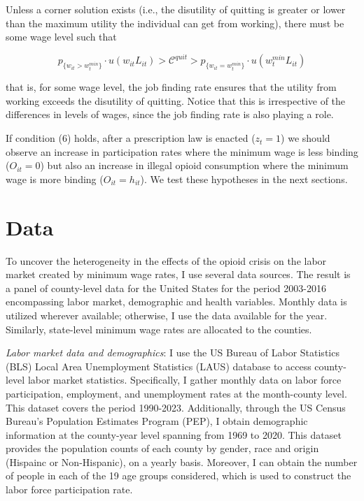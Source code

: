 \documentclass[12pt,a4paper]{article}
\begin{document}
Unless a corner solution exists (i.e., the disutility of quitting is greater or lower than the maximum utility the individual can get from working), there must be some wage level such that

\begin{equation}
    p_{\{w_{it} > w^{min}_t\}}\cdot u(w_{it}L_{it}) > \mathcal{C}^{quit} > p_{\{w_{it} = w^{min}_t\}}\cdot u(w^{min}_t L_{it})
\end{equation}

that is, for some wage level, the job finding rate ensures that the utility from working exceeds the disutility of quitting.
Notice that this is irrespective of the differences in levels of wages, since the job finding rate is also playing a role.

If condition (6) holds, after a prescription law is enacted (\(z_{t} = 1\)) we should observe an increase in participation rates where the minimum wage is less binding (\(O_{it} = 0\)) but also an increase in illegal opioid consumption where the minimum wage is more binding (\(O_{it} = h_{it}\)).
We test these hypotheses in the next sections.

\section*{Data}

To uncover the heterogeneity in the effects of the opioid crisis on the labor market created by minimum wage rates, I use several data sources.
The result is a panel of county-level data for the United States for the period 2003-2016 encompassing labor market, demographic and health variables.
Monthly data is utilized wherever available; otherwise, I use the data available for the year.
Similarly, state-level minimum wage rates are allocated to the counties.

\textit{Labor market data and demographics}: 
I use the US Bureau of Labor Statistics (BLS) Local Area Unemployment Statistics (LAUS) database to access county-level labor market statistics. 
Specifically, I gather monthly data on labor force participation, employment, and unemployment rates at the month-county level.
This dataset covers the period 1990-2023. 
Additionally, through the US Census Bureau's Population Estimates Program (PEP), I obtain demographic information at the county-year level spanning from 1969 to 2020. 
This dataset provides the population counts of each county by gender, race and origin (Hispainc or Non-Hispanic), on a yearly basis.
Moreover, I can obtain the number of people in each of the 19 age groups considered, which is used to construct the labor force participation rate.
\end{document}
